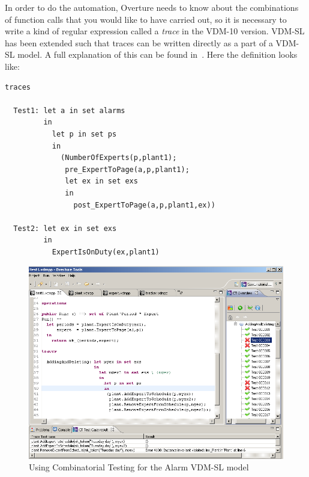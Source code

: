{In order to do the automation, Overture needs to know about the
combinations of function calls that you would like to have carried
out, so it is necessary to write a kind of regular expression called a
\emph{trace} in the VDM-10 version. VDM-SL has been extended such that
traces can be written directly as a part of a VDM-SL model. A full
explanation of this can be found in~\cite{Larsen&09d}. Here the
definition looks like:

\begin{lstlisting}
traces

  Test1: let a in set alarms
         in
           let p in set ps 
           in
             (NumberOfExperts(p,plant1);
              pre_ExpertToPage(a,p,plant1);
              let ex in set exs
              in
                post_ExpertToPage(a,p,plant1,ex))
               
  Test2: let ex in set exs
         in
           ExpertIsOnDuty(ex,plant1)
\end{lstlisting}

\begin{figure}[htbp]
\begin{center}
\includegraphics[width=4.5in]{figures/tracesalarm}
\caption{Using Combinatorial Testing for the Alarm VDM-SL model\label{fig:stracesalarm}}
\end{center}
\end{figure}

}
